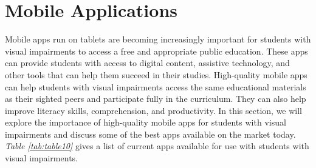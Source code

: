 \pagebreak
\hypertarget{tablet-apps}{}\section{Mobile Applications}\label{tab:tablelet-apps}
Mobile apps run on tablets are becoming increasingly important for students with visual impairments to access a free and appropriate public education. These apps can provide students with access to digital content, assistive technology, and other tools that can help them succeed in their studies. High-quality mobile apps can help students with visual impairments access the same educational materials as their sighted peers and participate fully in the curriculum. They can also help improve literacy skills, comprehension, and productivity. In this section, we will explore the importance of high-quality mobile apps for students with visual impairments and discuss some of the best apps available on the market today. \textit{Table \ref{tab:table10}} gives a list of current apps available for use with students with visual impairments.

